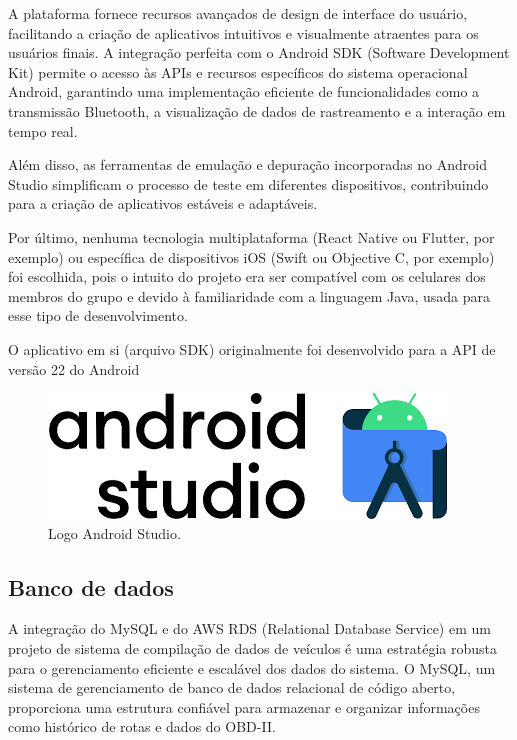     A plataforma fornece recursos avançados de design de interface do usuário, facilitando a criação de aplicativos intuitivos e visualmente atraentes para os usuários finais. A integração perfeita com o Android SDK (Software Development Kit) permite o acesso às APIs e recursos específicos do sistema operacional Android, garantindo uma implementação eficiente de funcionalidades como a transmissão Bluetooth, a visualização de dados de rastreamento e a interação em tempo real. 
    
    Além disso, as ferramentas de emulação e depuração incorporadas no Android Studio simplificam o processo de teste em diferentes dispositivos, contribuindo para a criação de aplicativos estáveis e adaptáveis.

    Por último, nenhuma tecnologia multiplataforma (React Native ou Flutter, por exemplo) ou específica de dispositivos iOS (Swift ou Objective C, por exemplo) foi escolhida, pois o intuito do projeto era ser compatível com os celulares dos membros do grupo e devido à familiaridade com a linguagem Java, usada para esse tipo de desenvolvimento.

    O aplicativo em si (arquivo SDK) originalmente foi desenvolvido para a API de versão 22 do Android

     \begin{figure}[hp]
    \centering
    
    \includegraphics[scale=0.4]{figures/logo_android.png}
    
    \caption{Logo Android Studio.}
    
\end{figure}
    
     \subsection{Banco de dados} A integração do MySQL e do AWS RDS (Relational Database Service) em um projeto de sistema de compilação de dados de veículos é uma estratégia robusta para o gerenciamento eficiente e escalável dos dados do sistema. O MySQL, um sistema de gerenciamento de banco de dados relacional de código aberto, proporciona uma estrutura confiável para armazenar e organizar informações como histórico de rotas e dados do OBD-II. 
     
